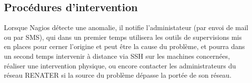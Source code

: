 \documentclass[a4paper]{article}
\begin{document}
\subsection{Procédures d'intervention}

Lorsque Nagios détecte une anomalie, il notifie l'administateur (par envoi de mail ou par SMS), qui dans un premier temps utilisera les outils de supervisions mis en places pour cerner l'origine et peut être la cause du problème, et pourra dans un second temps intervenir à distance via SSH sur les machines concernées, réaliser une intervention physique, ou encore contacter les administrateurs du réseau RENATER si la source du problème dépasse la portée de son réseau.


%   
%   
%
\end{document}
